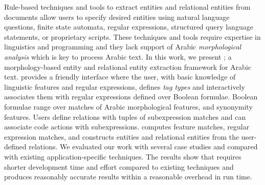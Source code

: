 Rule-based techniques and tools to extract entities and relational entities from documents allow users to specify desired entities using natural language questions, finite state automata, regular expressions, structured query language statements, or proprietary scripts.
These techniques and tools require expertise in linguistics and programming and they lack support of Arabic {\em morphological analysis} which is key to process Arabic text.
In this work, we present \framework; a morphology-based entity and relational entity extraction framework for Arabic text.
\framework provides a friendly interface where the user, with basic knowledge of linguistic features and regular expressions, defines {\em tag types} and interactively associates them with regular expressions defined over Boolean formulae.
Boolean formulae range over matches of Arabic morphological features, and synonymity features.
Users define relations with tuples of subexpression matches and can associate code actions with subexpressions.
\framework computes feature matches, regular expression matches, and constructs entities and relational entities from the user-defined relations.
We evaluated our work with several case studies and compared with existing application-specific techniques.
The results show that \framework requires shorter development time and effort compared to existing techniques and produces reasonably accurate results within a reasonable overhead in run time.